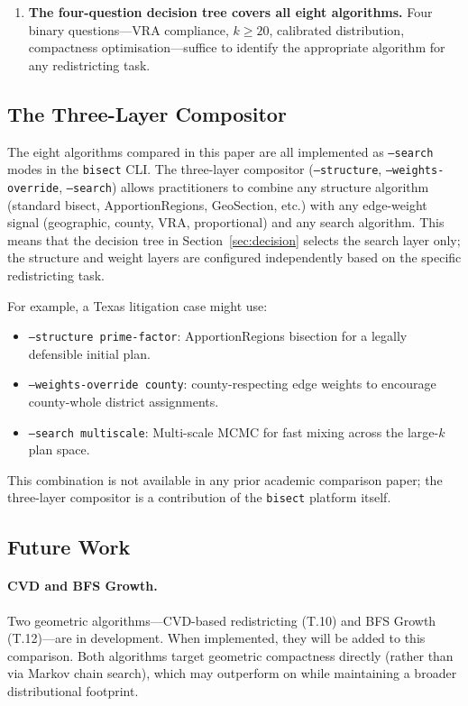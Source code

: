 \begin{enumerate}
  \item \textbf{The four-question decision tree covers all eight algorithms.}
        Four binary questions---VRA compliance, $k \geq 20$, calibrated
        distribution, compactness optimisation---suffice to identify the
        appropriate algorithm for any redistricting task.

\end{enumerate}

\subsection{The Three-Layer Compositor}

The eight algorithms compared in this paper are all implemented as
\texttt{--search} modes in the \texttt{bisect} CLI.
The three-layer compositor (\texttt{--structure},
\texttt{--weights-override}, \texttt{--search}) allows practitioners to
combine any structure algorithm (standard bisect, ApportionRegions,
GeoSection, etc.) with any edge-weight signal (geographic, county, VRA,
proportional) and any search algorithm.
This means that the decision tree in Section~\ref{sec:decision} selects
the search layer only; the structure and weight layers are configured
independently based on the specific redistricting task.

For example, a Texas litigation case might use:
\begin{itemize}
  \item \texttt{--structure prime-factor}: ApportionRegions bisection for
        a legally defensible initial plan.
  \item \texttt{--weights-override county}: county-respecting edge weights to
        encourage county-whole district assignments.
  \item \texttt{--search multiscale}: Multi-scale MCMC for fast mixing
        across the large-$k$ plan space.
\end{itemize}

This combination is not available in any prior academic comparison paper;
the three-layer compositor is a contribution of the \texttt{bisect}
platform itself.

\subsection{Future Work}

\paragraph{CVD and BFS Growth.}
Two geometric algorithms---CVD-based redistricting (T.10) and BFS Growth
(T.12)---are in development.
When implemented, they will be added to this comparison.
Both algorithms target geometric compactness directly (rather than
via Markov chain search), which may outperform \sburst{} on \pp{} while
maintaining a broader distributional footprint.

